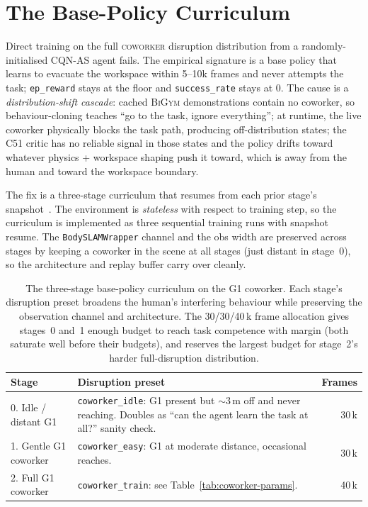 \documentclass[11pt,a4paper]{report}
\newcommand{\bigym}{\textsc{BiGym}}
\newcommand{\cqnas}{CQN-AS}
\newcommand{\coworker}{\textsc{coworker}}
\begin{document}
\section{The Base-Policy Curriculum}
\label{sec:method:curriculum}

Direct training on the full \coworker{} disruption distribution
from a randomly-initialised \cqnas{} agent fails. The empirical
signature is a base policy that learns to evacuate the workspace
within 5--10k frames and never attempts the task;
\texttt{ep\_reward} stays at the floor and \texttt{success\_rate}
stays at 0. The cause is a \emph{distribution-shift cascade}:
cached \bigym{} demonstrations contain no coworker, so
behaviour-cloning teaches ``go to the task, ignore everything''; at
runtime, the live coworker physically blocks the task path,
producing off-distribution states; the C51 critic has no reliable
signal in those states and the policy drifts toward whatever
physics + workspace shaping push it toward, which is away from the
human and toward the workspace boundary.

The fix is a three-stage curriculum that resumes from each prior
stage's snapshot~\cite{narvekar2020curriculum}. The environment is
\emph{stateless} with respect to training step, so the curriculum
is implemented as three sequential training runs with snapshot
resume. The \texttt{BodySLAMWrapper} channel and the obs width are
preserved across stages by keeping a coworker in the scene at all
stages (just distant in stage~0), so the architecture and replay
buffer carry over cleanly.

\begin{table}[h]
\centering
\caption{The three-stage base-policy curriculum on the G1 coworker.
Each stage's disruption preset broadens the human's interfering
behaviour while preserving the observation channel and
architecture. The 30/30/40\,k frame allocation gives stages~0 and~1
enough budget to reach task competence with margin (both saturate
well before their budgets), and reserves the largest budget for
stage~2's harder full-disruption distribution.}
\label{tab:curriculum-stages}
\small
\begin{tabular}{lp{6.5cm}r}
\toprule
Stage & Disruption preset & Frames \\
\midrule
0. Idle / distant G1     & \texttt{coworker\_idle}: G1 present
  but $\sim$3\,m off and never reaching. Doubles as ``can the
  agent learn the task at all?'' sanity check. & 30\,k \\
1. Gentle G1 coworker    & \texttt{coworker\_easy}: G1 at moderate
  distance, occasional reaches.                              & 30\,k \\
2. Full G1 coworker      & \texttt{coworker\_train}: see
  Table~\ref{tab:coworker-params}.                           & 40\,k \\
\bottomrule
\end{tabular}
\end{table}
\end{document}
